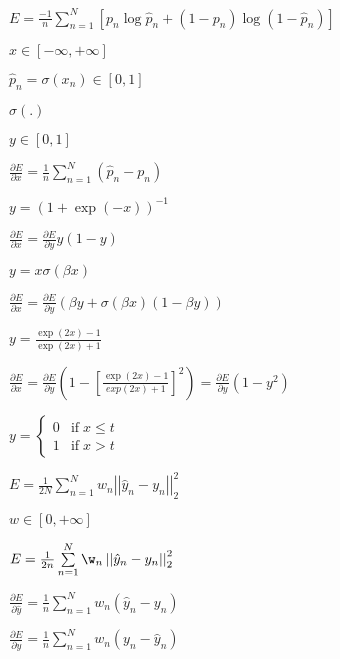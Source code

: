 \documentclass{article}
\begin{document}
$ E = \frac{-1}{n} \sum\limits_{n=1}^N \left[ p_n \log \hat{p}_n + (1 - p_n) \log(1 - \hat{p}_n) \right] $
\pagebreak

$ x \in [-\infty, +\infty]$
\pagebreak

$ \hat{p}_n = \sigma(x_n) \in [0, 1] $
\pagebreak

$ \sigma(.) $
\pagebreak

$ y \in [0, 1] $
\pagebreak

$ \frac{\partial E}{\partial x} = \frac{1}{n} \sum\limits_{n=1}^N (\hat{p}_n - p_n) $
\pagebreak

$ y = (1 + \exp(-x))^{-1} $
\pagebreak

$ \frac{\partial E}{\partial x} = \frac{\partial E}{\partial y} y (1 - y) $
\pagebreak

$ y = x \sigma (\beta x) $
\pagebreak

$ \frac{\partial E}{\partial x} = \frac{\partial E}{\partial y}(\beta y + \sigma (\beta x)(1 - \beta y)) $
\pagebreak

$ y = \frac{\exp(2x) - 1}{\exp(2x) + 1} $
\pagebreak

$ \frac{\partial E}{\partial x} = \frac{\partial E}{\partial y} \left(1 - \left[\frac{\exp(2x) - 1}{exp(2x) + 1} \right]^2 \right) = \frac{\partial E}{\partial y} (1 - y^2) $
\pagebreak

$ y = \left\{ \begin{array}{lr} 0 & \mathrm{if} \; x \le t \\ 1 & \mathrm{if} \; x > t \end{array} \right. $
\pagebreak

$ E = \frac{1}{2N} \sum\limits_{n=1}^N w_n \left| \left| \hat{y}_n - y_n \right| \right|_2^2 $
\pagebreak

$ w \in [0, +\infty] $
\pagebreak

$ E = \frac{1}{2n} \sum\limits_{n=1}^N \w_n \left| \left| \hat{y}_n - y_n \right| \right|_2^2 $
\pagebreak

$ \frac{\partial E}{\partial \hat{y}} = \frac{1}{n} \sum\limits_{n=1}^N w_n (\hat{y}_n - y_n) $
\pagebreak

$ \frac{\partial E}{\partial y} = \frac{1}{n} \sum\limits_{n=1}^N w_n (y_n - \hat{y}_n) $
\pagebreak
\end{document}
